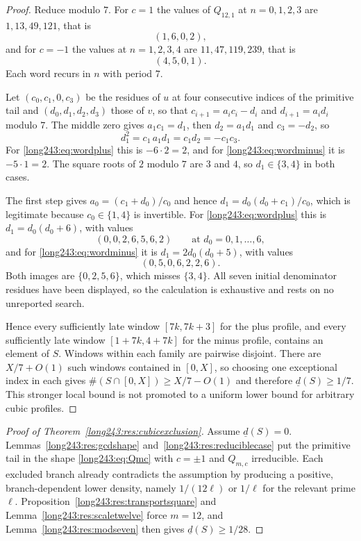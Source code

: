 \begin{proof}
Reduce modulo $7$.  For $c=1$ the values of $Q_{12,1}$ at $n=0,1,2,3$ are
$1,13,49,121$, that is
\begin{equation}\label{long243:eq:wordplus}
 (1,6,0,2),
\end{equation}
and for $c=-1$ the values at $n=1,2,3,4$ are $11,47,119,239$, that is
\begin{equation}\label{long243:eq:wordminus}
 (4,5,0,1).
\end{equation}
Each word recurs in $n$ with period $7$.

Let $(c_0,c_1,0,c_3)$ be the residues of $u$ at four consecutive indices of the
primitive tail and $(d_0,d_1,d_2,d_3)$ those of $v$, so that
$c_{i+1}=a_ic_i-d_i$ and $d_{i+1}=a_id_i$ modulo $7$.  The middle zero gives
$a_1c_1=d_1$, then $d_2=a_1d_1$ and $c_3=-d_2$, so
\begin{equation}\label{long243:eq:d1square}
 d_1^2=c_1\,a_1d_1=c_1d_2=-c_1c_3 .
\end{equation}
For \eqref{long243:eq:wordplus} this is $-6\cdot2=2$, and for \eqref{long243:eq:wordminus} it
is $-5\cdot1=2$.  The square roots of $2$ modulo $7$ are $3$ and $4$, so
$d_1\in\{3,4\}$ in both cases.

The first step gives $a_0=(c_1+d_0)/c_0$ and hence
$d_1=d_0(d_0+c_1)/c_0$, which is legitimate because $c_0\in\{1,4\}$ is
invertible.  For \eqref{long243:eq:wordplus} this is $d_1=d_0(d_0+6)$, with values
\[
 (0,0,2,6,5,6,2) \qquad\text{at } d_0=0,1,\ldots,6,
\]
and for \eqref{long243:eq:wordminus} it is $d_1=2d_0(d_0+5)$, with values
\[
 (0,5,0,6,2,2,6).
\]
Both images are $\{0,2,5,6\}$, which misses $\{3,4\}$.  All seven initial
denominator residues have been displayed, so the calculation is exhaustive and
rests on no unreported search.

Hence every sufficiently late window $[7k,7k+3]$ for the plus profile,
and every sufficiently late window $[1+7k,4+7k]$ for the minus profile,
contains an element of $S$. Windows within each family are pairwise disjoint.
There are $X/7+O(1)$ such windows contained in $[0,X]$, so choosing one
exceptional index in each gives $\#(S\cap[0,X])\ge X/7-O(1)$ and therefore
$\underline d(S)\ge1/7$. This stronger local bound is not promoted to a
uniform lower bound for arbitrary cubic profiles.
\end{proof}

\begin{proof}[Proof of Theorem~\ref{long243:res:cubicexclusion}]
Assume $\underline d(S)=0$.  Lemmas~\ref{long243:res:gcdshape}
and~\ref{long243:res:reduciblecase} put the primitive tail in the shape \eqref{long243:eq:Qmc}
with $c=\pm1$ and $Q_{m,c}$ irreducible.  Each excluded branch already
contradicts the assumption by producing a positive, branch-dependent lower
density, namely $1/(12\ell)$ or $1/\ell$ for the relevant prime $\ell$.
Proposition~\ref{long243:res:transportsquare} and Lemma~\ref{long243:res:scaletwelve} force
$m=12$, and Lemma~\ref{long243:res:modseven} then gives $\underline d(S)\ge1/28$.
\end{proof}

